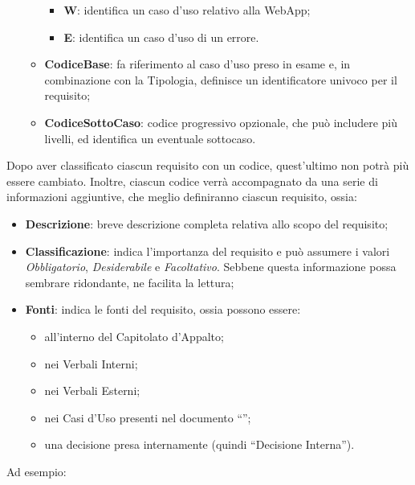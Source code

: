 \begin{itemize}
\begin{itemize}
		\begin{itemize}
			\item \textbf{W}: identifica un caso d'uso relativo alla WebApp;
			\item \textbf{E}: identifica un caso d'uso di un errore.
		\end{itemize}
	\item \textbf{CodiceBase}: fa riferimento al caso d’uso preso in esame e, in combinazione con la Tipologia, definisce un identificatore univoco per il requisito;
	\item \textbf{CodiceSottoCaso}: codice progressivo opzionale, che può includere più livelli, ed identifica un eventuale sottocaso.
\end{itemize}
\end{itemize}

Dopo aver classificato ciascun requisito con un codice, quest’ultimo non potrà più essere cambiato.
Inoltre, ciascun codice verrà accompagnato da una serie di informazioni aggiuntive, che meglio definiranno ciascun requisito, ossia:

\begin{itemize}
	\item \textbf{Descrizione}: breve descrizione completa relativa allo scopo del requisito;
	\item \textbf{Classificazione}: indica l’importanza del requisito e può assumere i valori \textit{Obbligatorio}, \textit{Desiderabile} e \textit{Facoltativo}. Sebbene questa informazione possa sembrare ridondante, ne facilita la lettura;
	\item \textbf{Fonti}: indica le fonti del requisito, ossia possono essere:
	\begin{itemize}
		\item all'interno del Capitolato d’Appalto;
		\item nei Verbali Interni;
		\item nei Verbali Esterni;
		\item nei Casi d’Uso presenti nel documento “\AdR”;
		\item una decisione presa internamente (quindi “Decisione Interna”).
	\end{itemize}	 
\end{itemize}

Ad esempio:\\

